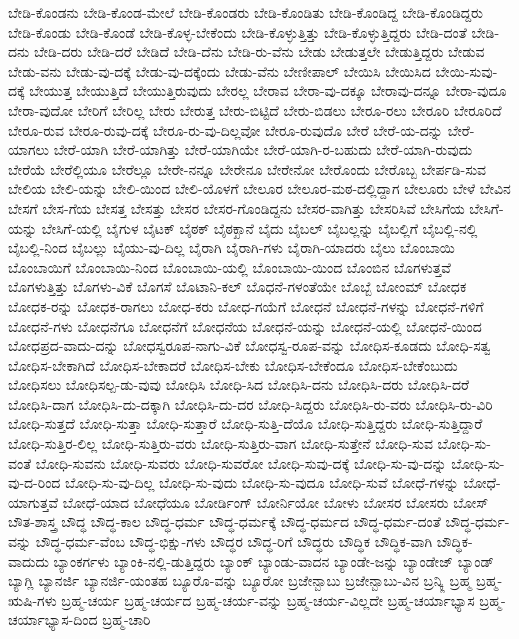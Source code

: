 {ಬೇಡಿ-ಕೊಂಡನು
ಬೇಡಿ-ಕೊಂಡ-ಮೇಲೆ
ಬೇಡಿ-ಕೊಂಡರು
ಬೇಡಿ-ಕೊಂಡಿತು
ಬೇಡಿ-ಕೊಂಡಿದ್ದ
ಬೇಡಿ-ಕೊಂಡಿದ್ದರು
ಬೇಡಿ-ಕೊಂಡು
ಬೇಡಿ-ಕೊಂಡೆ
ಬೇಡಿ-ಕೊಳ್ಳ-ಬೇಕೆಂದು
ಬೇಡಿ-ಕೊಳ್ಳುತ್ತಿತ್ತು
ಬೇಡಿ-ಕೊಳ್ಳುತ್ತಿದ್ದರು
ಬೇಡಿ-ದಂತೆ
ಬೇಡಿ-ದನು
ಬೇಡಿ-ದರು
ಬೇಡಿ-ದರೆ
ಬೇಡಿದೆ
ಬೇಡಿ-ದೆನು
ಬೇಡಿ-ರು-ವೆನು
ಬೇಡು
ಬೇಡುತ್ತಲೇ
ಬೇಡುತ್ತಿದ್ದರು
ಬೇಡುವ
ಬೇಡು-ವನು
ಬೇಡು-ವು-ದಕ್ಕೆ
ಬೇಡು-ವು-ದಕ್ಕೆಂದು
ಬೇಡು-ವೆನು
ಬೇಣೀಪಾಲ್
ಬೇಯಿಸಿ
ಬೇಯಿಸಿದ
ಬೇಯಿ-ಸುವು-ದಕ್ಕೆ
ಬೇಯುತ್ತ
ಬೇಯುತ್ತಿದೆ
ಬೇಯುತ್ತಿರುವುದು
ಬೇರಲ್ಲ
ಬೇರಾವ
ಬೇರಾ-ವು-ದಕ್ಕೂ
ಬೇರಾವು-ದನ್ನೂ
ಬೇರಾ-ವುದೂ
ಬೇರಾ-ವುದೋ
ಬೇರಿಗೆ
ಬೇರಿಲ್ಲ
ಬೇರು
ಬೇರುತ್ತ
ಬೇರು-ಬಿಟ್ಟಿದೆ
ಬೇರು-ಬಿಡಲು
ಬೇರೂ-ರಲು
ಬೇರೂರಿ
ಬೇರೂರಿದೆ
ಬೇರೂ-ರುವ
ಬೇರೂ-ರುವು-ದಕ್ಕೆ
ಬೇರೂ-ರು-ವು-ದಿಲ್ಲವೋ
ಬೇರೂ-ರುವುದೊ
ಬೇರೆ
ಬೇರೆ-ಯ-ದನ್ನು
ಬೇರೆ-ಯಾಗಲು
ಬೇರೆ-ಯಾಗಿ
ಬೇರೆ-ಯಾಗಿತ್ತು
ಬೇರೆ-ಯಾಗಿಯೇ
ಬೇರೆ-ಯಾಗಿ-ರ-ಬಹುದು
ಬೇರೆ-ಯಾಗಿ-ರುವುದು
ಬೇರೆಯೆ
ಬೇರೆಲ್ಲಿಯೂ
ಬೇರೆಲ್ಲೂ
ಬೇರೇ-ನನ್ನೂ
ಬೇರೇನೂ
ಬೇರೇನೋ
ಬೇರೊಂದು
ಬೇರೊಬ್ಬ
ಬೇರ್ಪಡಿ-ಸುವ
ಬೇಲಿಯ
ಬೇಲಿ-ಯನ್ನು
ಬೇಲಿ-ಯಿಂದ
ಬೇಲಿ-ಯೊಳಗೆ
ಬೇಲೂರ
ಬೇಲೂರ-ಮಠ-ದಲ್ಲಿದ್ದಾಗ
ಬೇಲೂರು
ಬೇಳೆ
ಬೇವಿನ
ಬೇಸಗೆ
ಬೇಸ-ಗೆಯ
ಬೇಸತ್ತ
ಬೇಸತ್ತು
ಬೇಸರ
ಬೇಸರ-ಗೊಂಡಿದ್ದನು
ಬೇಸರ-ವಾಗಿತ್ತು
ಬೇಸರಿಸಿವೆ
ಬೇಸಿಗೆಯ
ಬೇಸಿಗೆ-ಯನ್ನು
ಬೇಸಿಗೆ-ಯಲ್ಲಿ
ಬೈಗುಳ
ಬೈಟಕ್
ಬೈಠಕ್
ಬೈಠಕ್ಖಾನೆ
ಬೈದು
ಬೈಬಲ್
ಬೈಬಲ್ಲನ್ನು
ಬೈಬಲ್ಲಿಗೆ
ಬೈಬಲ್ಲಿ-ನಲ್ಲಿ
ಬೈಬಲ್ಲಿ-ನಿಂದ
ಬೈಬಲ್ಲು
ಬೈಯು-ವು-ದಿಲ್ಲ
ಬೈರಾಗಿ
ಬೈರಾಗಿ-ಗಳು
ಬೈರಾಗಿ-ಯಾದರು
ಬೈಲು
ಬೊಂಬಾಯಿ
ಬೊಂಬಾಯಿಗೆ
ಬೊಂಬಾಯಿ-ನಿಂದ
ಬೊಂಬಾಯಿ-ಯಲ್ಲಿ
ಬೊಂಬಾಯಿ-ಯಿಂದ
ಬೊಂಬಿನ
ಬೊಗಳುತ್ತವೆ
ಬೊಗಳುತ್ತಿತ್ತು
ಬೊಗಳು-ವಿಕೆ
ಬೊಗಸೆ
ಬೊಟಾನಿ-ಕಲ್
ಬೊಧನೆ-ಗಳಂತೆಯೇ
ಬೊಬ್ಬೆ
ಬೋಂಮ್
ಬೋಧಕ
ಬೋಧಕ-ರನ್ನು
ಬೋಧಕ-ರಾಗಲು
ಬೋಧ-ಕರು
ಬೋಧ-ಗಯೆಗೆ
ಬೋಧನೆ
ಬೋಧನೆ-ಗಳನ್ನು
ಬೋಧನೆ-ಗಳಿಗೆ
ಬೋಧನೆ-ಗಳು
ಬೋಧನೆಗೂ
ಬೋಧನೆಗೆ
ಬೋಧನೆಯ
ಬೋಧನೆ-ಯನ್ನು
ಬೋಧನೆ-ಯಲ್ಲಿ
ಬೋಧನೆ-ಯಿಂದ
ಬೋಧಪ್ರದ-ವಾದು-ದನ್ನು
ಬೋಧಸ್ವರೂಪ-ನಾಗು-ವಿಕೆ
ಬೋಧಸ್ವ-ರೂಪ-ವನ್ನು
ಬೋಧಿಸ-ಕೂಡದು
ಬೋಧಿ-ಸತ್ವ
ಬೋಧಿಸ-ಬೇಕಾಗಿದೆ
ಬೋಧಿಸ-ಬೇಕಾದರೆ
ಬೋಧಿಸ-ಬೇಕು
ಬೋಧಿಸ-ಬೇಕೆಂದೂ
ಬೋಧಿಸ-ಬೇಕೆಂಬುದು
ಬೋಧಿಸಲು
ಬೋಧಿಸಲ್ಪ-ಡು-ವುವು
ಬೋಧಿಸಿ
ಬೋಧಿ-ಸಿದ
ಬೋಧಿಸಿ-ದನು
ಬೋಧಿಸಿ-ದರು
ಬೋಧಿಸಿ-ದರೆ
ಬೋಧಿಸಿ-ದಾಗ
ಬೋಧಿಸಿ-ದು-ದಕ್ಕಾಗಿ
ಬೋಧಿಸಿ-ದು-ದರ
ಬೋಧಿ-ಸಿದ್ದರು
ಬೋಧಿಸಿ-ರು-ವರು
ಬೋಧಿಸಿ-ರು-ವಿರಿ
ಬೋಧಿ-ಸುತ್ತದೆ
ಬೋಧಿ-ಸುತ್ತಾ
ಬೋಧಿ-ಸುತ್ತಾರೆ
ಬೋಧಿ-ಸುತ್ತಿ-ದೆಯೊ
ಬೋಧಿ-ಸುತ್ತಿದ್ದರು
ಬೋಧಿ-ಸುತ್ತಿದ್ದಾರೆ
ಬೋಧಿ-ಸುತ್ತಿರ-ಲಿಲ್ಲ
ಬೋಧಿ-ಸುತ್ತಿರು-ವರು
ಬೋಧಿ-ಸುತ್ತಿರು-ವಾಗ
ಬೋಧಿ-ಸುತ್ತೇನೆ
ಬೋಧಿ-ಸುವ
ಬೋಧಿ-ಸು-ವಂತೆ
ಬೋಧಿ-ಸುವನು
ಬೋಧಿ-ಸುವರು
ಬೋಧಿ-ಸುವರೋ
ಬೋಧಿ-ಸುವು-ದಕ್ಕೆ
ಬೋಧಿ-ಸು-ವು-ದನ್ನು
ಬೋಧಿ-ಸು-ವು-ದ-ರಿಂದ
ಬೋಧಿ-ಸು-ವು-ದಿಲ್ಲ
ಬೋಧಿ-ಸು-ವುದು
ಬೋಧಿ-ಸು-ವುದೂ
ಬೋಧಿ-ಸುವೆ
ಬೋಧೆ-ಗಳನ್ನು
ಬೋಧೆ-ಯಾಗುತ್ತವೆ
ಬೋಧೆ-ಯಾದ
ಬೋಧೆಯೂ
ಬೋರ್ಡಿಂಗ್
ಬೋರ್ನಿಯೋ
ಬೋಳು
ಬೋಸರ
ಬೋಸರು
ಬೋಸ್
ಬೌತ-ಶಾಸ್ತ್ರ
ಬೌದ್ಧ
ಬೌದ್ಧ-ಕಾಲ
ಬೌದ್ಧ-ಧರ್ಮ
ಬೌದ್ಧ-ಧರ್ಮಕ್ಕೆ
ಬೌದ್ಧ-ಧರ್ಮದ
ಬೌದ್ಧ-ಧರ್ಮ-ದಂತೆ
ಬೌದ್ಧ-ಧರ್ಮ-ವನ್ನು
ಬೌದ್ಧ-ಧರ್ಮ-ವೆಂಬ
ಬೌದ್ಧ-ಭಿಕ್ಷು-ಗಳು
ಬೌದ್ಧರ
ಬೌದ್ಧ-ರಿಗೆ
ಬೌದ್ಧರು
ಬೌದ್ಧಿಕ
ಬೌದ್ಧಿಕ-ವಾಗಿ
ಬೌದ್ಧಿಕ-ವಾದುದು
ಬ್ಯಾಂಕರ್ಗಳು
ಬ್ಯಾಂಕಿ-ನಲ್ಲಿ-ಡುತ್ತಿದ್ದರು
ಬ್ಯಾಂಕ್
ಬ್ಯಾಂಡು-ವಾದನ
ಬ್ಯಾಂಡೇ-ಜನ್ನು
ಬ್ಯಾಂಡೇಜ್
ಬ್ಯಾಂಡ್
ಬ್ಯಾಗ್ಲಿ
ಬ್ಯಾನರ್ಜಿ
ಬ್ಯಾನರ್ಜಿ-ಯಂತಹ
ಬ್ಯೂರೊ-ವನ್ನು
ಬ್ಯೂರೋ
ಬ್ರಜೇನ್ಬಾಬು
ಬ್ರಜೇನ್ಬಾಬು-ವಿನ
ಬ್ರನ್ಕ್ಲಿ
ಬ್ರಹ್ಮ
ಬ್ರಹ್ಮ-ಋಷಿ-ಗಳು
ಬ್ರಹ್ಮ-ಚರ್ಯ
ಬ್ರಹ್ಮ-ಚರ್ಯದ
ಬ್ರಹ್ಮ-ಚರ್ಯ-ವನ್ನು
ಬ್ರಹ್ಮ-ಚರ್ಯ-ವಿಲ್ಲದೇ
ಬ್ರಹ್ಮ-ಚರ್ಯಾಭ್ಯಾಸ
ಬ್ರಹ್ಮ-ಚರ್ಯಾಭ್ಯಾಸ-ದಿಂದ
ಬ್ರಹ್ಮ-ಚಾರಿ
}
